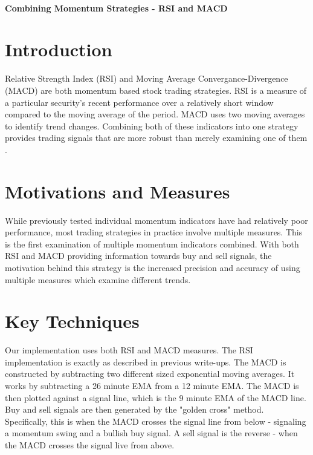 \documentclass[letterpaper,11pt]{article}
\begin{document}
\thispagestyle{plain}


 \\

\noindent\textbf{Combining Momentum Strategies - RSI and MACD }

\section*{Introduction }
Relative Strength Index (RSI) and Moving Average Convergance-Divergence (MACD) are both momentum based stock trading strategies. RSI is a measure of a particular security's recent performance over a relatively short window compared to the moving average of the period. MACD uses two moving averages to identify trend changes. Combining both of these indicators into one strategy provides trading signals that are more robust than merely examining one of them \cite{Chong2014}. 

\section*{Motivations and Measures}
While previously tested individual momentum indicators have had relatively poor performance, most trading strategies in practice involve multiple measures. This is the first examination of multiple momentum indicators combined. With both RSI and MACD providing information towards buy and sell signals, the motivation behind this strategy is the increased precision and accuracy of using multiple measures which examine different trends.


\section*{Key Techniques}
Our implementation uses both RSI and MACD measures. The RSI implementation is exactly as described in previous write-ups. The MACD is constructed by subtracting two different sized exponential moving averages. It works by subtracting a 26 minute EMA from a 12 minute EMA. The MACD is then plotted against a signal line, which is the 9 minute EMA of the MACD line. Buy and sell signals are then generated by the "golden cross" method. Specifically, this is when the MACD crosses the signal line from below - signaling a momentum swing and a bullish buy signal. A sell signal is the reverse - when the MACD crosses the signal live from above.
\end{document}
